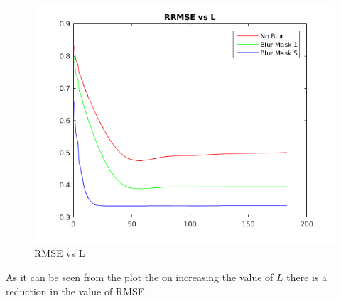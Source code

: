 \documentclass{article}
\begin{document}
\begin{figure}[h]
	\centering
	\includegraphics[scale = 0.8]{code/html/mainScript_08.png}
	\caption{RMSE vs L}
	\label{Fig :2c}
\end{figure}

As it can be seen from the plot the on increasing the value of $L$ there is a reduction in the value of RMSE. 
\end{document}
